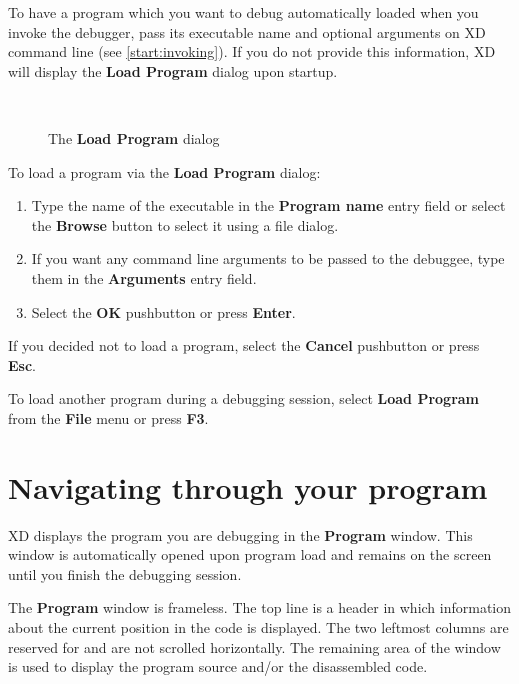 To have a program which you want to debug automatically loaded when
you invoke the debugger, pass its executable name and optional arguments
on XD command line (see \ref{start:invoking}).
If you do not provide this information,
XD will display the {\bf Load Program} dialog upon startup.

\ifcomment
\begin{figure}[h]
\begin{center}
\ \
\end{center}
\caption{The {\bf Load Program} dialog}
\end{figure}
\fi

To load a program via the {\bf Load Program} dialog:
\begin{enumerate}
\item Type the name of the executable in the {\bf Program name}
      entry field or select the {\bf Browse} button to select it using
      a file dialog.
\item If you want any command line arguments to be passed to the
      debuggee, type them in the {\bf Arguments} entry field.
\item Select the {\bf OK} pushbutton or press {\bf Enter}.
\end{enumerate}

If you decided not to load a program, select the {\bf Cancel}
pushbutton or press {\bf Esc}.


To load another program during a debugging session, select
{\bf Load Program} from the {\bf File} menu or press {\bf F3}.

\section{Navigating through your program}
\label{dialog:navigating}

XD displays the program you are debugging in the {\bf Program}
window. This window is automatically opened upon program load
and remains on the screen until you finish the debugging session.

The {\bf Program} window is frameless. The top line is a header in which
information about the current position in the code is displayed.
The two leftmost columns are reserved for 
and are not scrolled horizontally. The remaining area of the window is used
to display the program source and/or the disassembled code.

